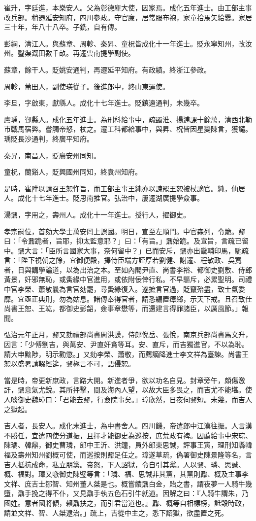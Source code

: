 \begin{pinyinscope}
崔升，字廷進，本樂安人。父為彰德庫大使，因家焉。成化五年進士。由工部主事改兵部。稍遷延安知府，四川參政。守官廉，居常服布袍，家童拾馬矢給爨。家居三十年，年八十八卒。子銑，自有傳。

彭綱，清江人。與蘇章、周軫、秦昇、童柷皆成化十一年進士。貶永寧知州，改汝州。鑿渠溉田數千畝。再遷雲南提學副使。

蘇章，餘干人。貶姚安通判，再遷延平知府。有政績。終浙江參政。

周軫，莆田人，副使瑛從子。後進郎中，終山東運使。

李旦，字啟東，獻縣人。成化十七年進士。貶鎮遠通判，未幾卒。

盧瑀，鄞縣人。成化五年進士。為刑科給事中，疏蠲淮、揚逋課十餘萬，清西北勒市戰馬宿弊。嘗觸帝怒，杖之。遷工科都給事中，與昇、柷皆因星變陳言，獲譴。瑀貶長沙通判，終廣平知府。

秦昇，南昌人，貶廣安州同知。

童柷，蘭谿人，貶興國州同知，終袁州知府。

是時，崔陞以請召王恕忤旨，而工部主事王純亦以諫罷王恕被杖謫官。純，仙居人。成化十七年進士。貶思南推官。弘治中，屢遷湖廣提學僉事。

湯鼐，字用之，壽州人。成化十一年進士。授行人，擢御史。

孝宗嗣位，首劾大學士萬安罔上誤國。明日，宣至左順門。中官森列，令跪。鼐曰：「令鼐跪者，旨耶，抑太監意耶？」曰：「有旨。」鼐始跪。及宣旨，言疏已留中。鼐大言：「臣所言國家大事，奈何留中？」已而安斥，鼐亦出畿輔印馬，馳疏言：「陛下視朝之餘，宜御便殿，擇侍臣端方謹厚若劉健、謝遷、程敏政、吳寬者，日與講學論道，以為出治之本。至如內閣尹直、尚書李裕、都御史劉敷、侍郎黃景，奸邪無恥，或夤緣中官進用，或依附佞倖行私。不早驅斥，必累聖明。司禮中官李榮、蕭敬曩為言官劾罷，尋夤緣復入。遂摭言官過，貶竄殆盡，致士氣委靡。宜亟正典刑，勿為姑息。諸傳奉得官者，請悉編置瘴鄉，示天下戒。且召致仕尚書王恕、王竑，都御史彭韶，僉事章懋等，而還建言得罪諸臣，以厲風節。」報聞。

弘治元年正月，鼐又劾禮部尚書周洪謨，侍郎倪岳、張悅，南京兵部尚書馬文升，因言：「少傅劉吉，與萬安、尹直奸貪等耳。安、直斥，而吉獨進官，不以為恥。請大申黜陟，明示勸懲。」又劾李榮、蕭敬，而薦謫降進士李文祥為臺諫。尚書王恕以盛暑請輟經筵，鼐極言不可，語侵恕。

當是時，帝更新庶政，言路大開。新進者爭，欲以功名自見。封章旁午，頗傷激訐，鼐意氣尤銳。其所抨擊，間及海內人望，以故大臣多畏之，而吉尤不能堪。使人啖御史魏璋曰：「君能去鼐，行僉院事矣。」璋欣然，日夜伺鼐短。未幾，而吉人之獄起。

吉人者，長安人。成化末進士，為中書舍人。四川饑，帝遣郎中江漢往振。人言漢不勝任，宜遣四使分道振，且擇才能御史為巡按，庶荒政有裨。因薦給事中宋琮、陳璚、韓鼎，御史曹璘，郎中王沂、洪鐘，員外郎東思誠，評事王寅，理刑知縣韓福及壽州知州劉概可使，而巡按則鼐足任之。璋遂草疏，偽署御史陳景隆等名，言吉人抵抗成命，私立朋黨。帝怒，下人詔獄，令自引其黨。人以鼐、璘、思誠、概、福對。璋又嗾御史陳璧等言：「璘、福、思誠非其黨，其黨則鼐、概及主事李文祥、庶吉士鄒智、知州董人桀是也。概嘗饋鼐白金，貽之書，謂夜夢一人騎牛幾墮，鼐手挽之得不仆，又見鼐手執五色石引牛就道。因解之曰：『人騎牛謂朱，乃國姓。意者國將傾，賴鼐扶之，而引君當道也。』鼐、概等自相標榜，詆毀時政，請並文祥、智、人桀逮治。」疏上，吉從中主之，悉下詔獄，欲盡置之死。


\end{pinyinscope}
